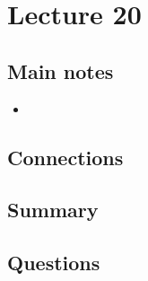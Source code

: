 \section{Lecture 20}
\subsection{Main notes}


\begin{itemize}
	\item
\end{itemize}


\subsection{Connections}


\subsection{Summary}


\subsection{Questions}
